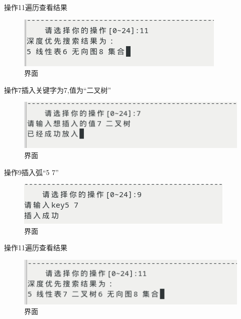\documentclass[supercite]{Experimental_Report}
\theoremstyle{definition}
\begin{document}
操作11遍历查看结果

\begin{figure}[!htb]
	\begin{center}
		\includegraphics[scale=0.60]{images/2-16.png}
		\caption{界面}
		\label{fig2-16}
		\end{center}
\end{figure}

操作7插入关键字为7,值为“二叉树”

\begin{figure}[!htb]
	\begin{center}
		\includegraphics[scale=0.60]{images/2-17.png}
		\caption{界面}
		\label{fig2-17}
		\end{center}
\end{figure}

操作9插入弧“5 7”

\begin{figure}[!htb]
	\begin{center}
		\includegraphics[scale=0.60]{images/2-18.png}
		\caption{界面}
		\label{fig2-18}
		\end{center}
\end{figure}

操作11遍历查看结果

\begin{figure}[!htb]
	\begin{center}
		\includegraphics[scale=0.60]{images/2-19.png}
		\caption{界面}
		\label{fig2-19}
		\end{center}
\end{figure}
\end{document}
